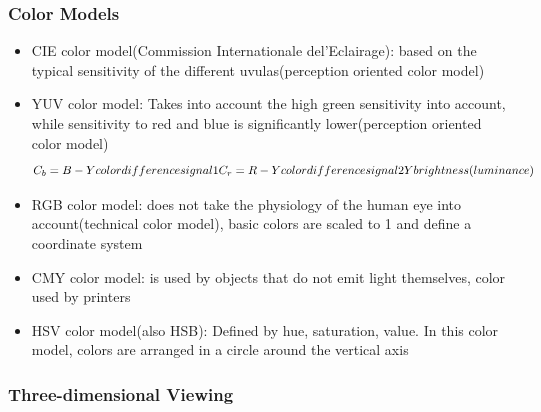 \documentclass{standalone}
\begin{document}
\subsubsection*{Color Models}
\begin{itemize}
		\item CIE color model(Commission Internationale del'Eclairage): based on the typical sensitivity of the different uvulas(perception oriented color model)
		\item YUV color model: Takes into account the high green sensitivity into account, while sensitivity to red and blue is significantly lower(perception oriented color model)
		$$ C_b = B - Y color difference signal 1 \\
		C_r = R - Y color difference signal 2 \\
		Y brightness (luminance) $$
		\item RGB color model: does not take the physiology of the human eye into account(technical color model), basic colors are scaled to 1 and define a coordinate system
		\item CMY color model: is used by objects that do not emit light themselves, color used by printers
		\item HSV color model(also HSB): Defined by hue, saturation, value. In this color model, colors are arranged in a circle around the vertical axis
\end{itemize}
\subsubsection{Three-dimensional Viewing}
\end{document}
